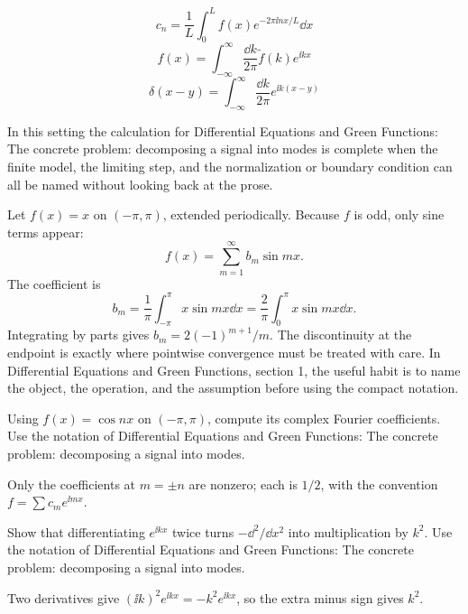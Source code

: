 \[
  c_n=\frac1L\int_0^L f(x)e^{-2\pi\ii nx/L}\dd x
\]
\[
  f(x)=\int_{-\infty}^{\infty}\frac{\dd k}{2\pi}\tilde f(k)e^{\ii kx}
\]
\[
  \delta(x-y)=\int_{-\infty}^{\infty}\frac{\dd k}{2\pi}e^{\ii k(x-y)}
\]

In this setting the calculation for Differential Equations and Green Functions: The concrete problem: decomposing a signal into modes is complete when the finite model, the limiting step, and the normalization or boundary condition can all be named without looking back at the prose.




\begin{example}
Let \(f(x)=x\) on \((-\pi,\pi)\), extended periodically.  Because \(f\) is odd, only sine terms appear:
\[
  f(x)=\sum_{m=1}^\infty b_m\sin mx.
\]
The coefficient is
\[
  b_m=\frac1\pi\int_{-\pi}^\pi x\sin mx\dd x
  =\frac2\pi\int_0^\pi x\sin mx\dd x.
\]
Integrating by parts gives \(b_m=2(-1)^{m+1}/m\).  The discontinuity at the endpoint is exactly where pointwise convergence must be treated with care.  In Differential Equations and Green Functions, section 1, the useful habit is to name the object, the operation, and the assumption before using the compact notation.
\end{example}



\begin{exercise}
Using \(f(x)=\cos nx\) on \((-\pi,\pi)\), compute its complex Fourier coefficients.  Use the notation of Differential Equations and Green Functions: The concrete problem: decomposing a signal into modes.
\begin{answer}
Only the coefficients at \(m=\pm n\) are nonzero; each is \(1/2\), with the convention \(f=\sum c_me^{\ii mx}\).
\end{answer}
\end{exercise}

\begin{exercise}
Show that differentiating \(e^{\ii kx}\) twice turns \(-\dd^2/\dd x^2\) into multiplication by \(k^2\).  Use the notation of Differential Equations and Green Functions: The concrete problem: decomposing a signal into modes.
\begin{answer}
Two derivatives give \((\ii k)^2e^{\ii kx}=-k^2e^{\ii kx}\), so the extra minus sign gives \(k^2\).
\end{answer}
\end{exercise}



